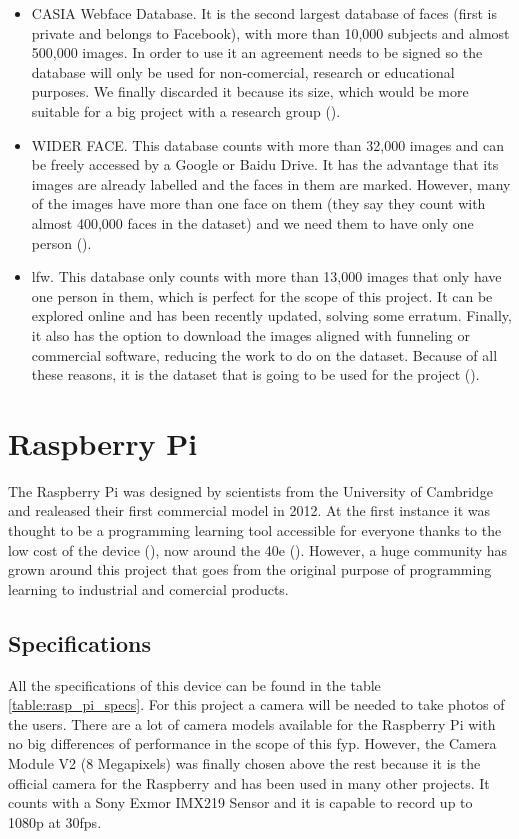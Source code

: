 \begin{itemize}
	\item CASIA Webface Database. It is the second largest database of faces (first is private and belongs to Facebook), with more than 10,000 subjects and almost 500,000 images. In order to use it an agreement needs to be signed so the database will only be used for non-comercial, research or educational purposes. We finally discarded it because its size, which would be more suitable for a big project with a research group (\cite{casia_db}). 
	\item WIDER FACE. This database counts with more than 32,000 images and can be freely accessed by a Google or Baidu Drive. It has the advantage that its images are already labelled and the faces in them are marked. However, many of the images have more than one face on them (they say they count with almost 400,000 faces in the dataset) and we need them to have only one person (\cite{widerf_db}).
	\item \gls{lfw}. This database only counts with more than 13,000 images that only have one person in them, which is perfect for the scope of this project. It can be explored online and has been recently updated, solving some erratum. Finally, it also has the option to download the images aligned with funneling or commercial software, reducing the work to do on the dataset. Because of all these reasons, it is the dataset that is going to be used for the project (\cite{lfw_db}).
\end{itemize}

\section{Raspberry Pi}	
The Raspberry Pi was designed by scientists from the University of Cambridge and realeased their first commercial model in 2012. At the first instance it was thought to be a programming learning tool accessible for everyone thanks to the low cost of the device (\cite{raspberry_pi_for_learning}), now around the 40e (\cite{price_raspberry_pi}). However, a huge community has grown around this project that goes from the original purpose of programming learning to industrial and comercial products.

	\subsection{Specifications}
	All the specifications of this device can be found in the table \ref{table:rasp_pi_specs}. For this project a camera will be needed to take photos of the users. There are a lot of camera models available for the Raspberry Pi with no big differences of performance in the scope of this \gls{fyp}. However, the Camera Module V2 (8 Megapixels) was finally chosen above the rest because it is the official camera for the Raspberry and has been used in many other projects. It counts with a Sony Exmor IMX219 Sensor and it is capable to record up to 1080p at 30fps.

